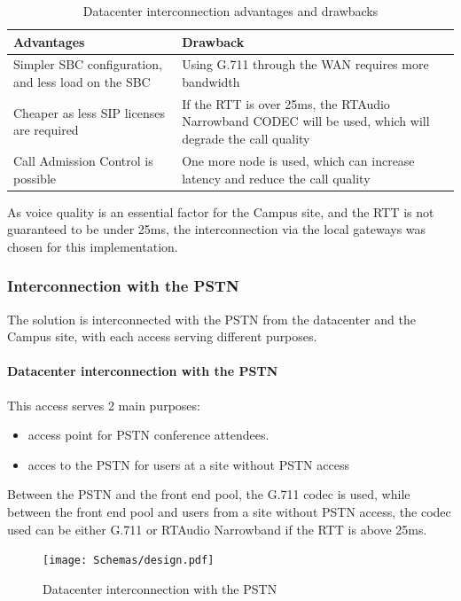 \begin{description}
			\begin{table}[H]
			\centering
			\begin{tabularx}{\textwidth}{X|X}
				\textbf{Advantages} & \textbf{Drawback} \\ \hline 
				Simpler SBC configuration, and less load on the SBC & Using G.711 through the WAN requires more bandwidth \\ \hline 
				Cheaper as less SIP licenses are required & If the RTT is over 25ms, the RTAudio Narrowband CODEC will be used, which will degrade the call quality\\ \hline 
				Call Admission Control is possible & One more node is used, which can increase latency and reduce the call quality
			\end{tabularx}
			\caption{\label{tab:case_toip_datacenter} Datacenter interconnection advantages and drawbacks}
			\end{table}	

	\end{description}
	
	As voice quality is an essential factor for the Campus site, and the RTT is not guaranteed to be under 25ms, the interconnection via the local gateways was chosen for this implementation.
	
	
\subsubsection{Interconnection with the PSTN}

	The solution is interconnected with the PSTN from the datacenter and the Campus site, with each access serving different purposes.
	
	\paragraph{Datacenter interconnection with the PSTN}
	This access serves 2 main purposes:
	\begin{itemize}
		\item access point for PSTN conference attendees.
		\item acces to the PSTN for users at a site without PSTN access
	\end{itemize}
	
	Between the PSTN and the front end pool, the G.711 codec is used, while between the front end pool and users from a site without PSTN access, the codec used can be either G.711 or RTAudio Narrowband if the RTT is above 25ms.
	\begin{figure}[H]
		\centering
		\texttt{[image: Schemas/design.pdf]}
		\caption{Datacenter interconnection with the PSTN}
		\label{fig:case_pstn_datacenter}
	\end{figure}
		
